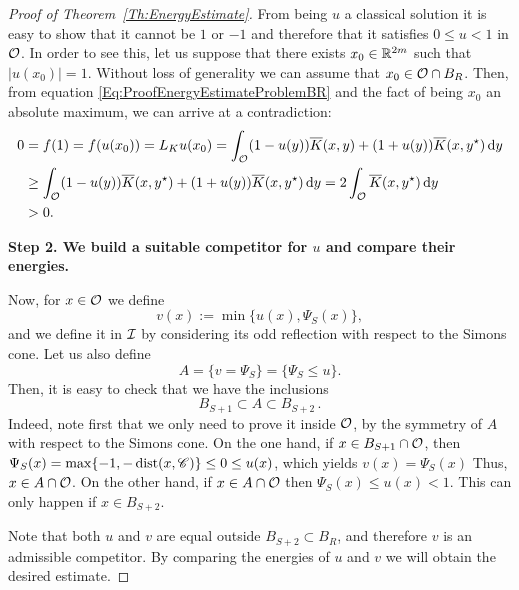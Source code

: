 \begin{proof}[Proof of Theorem~\ref{Th:EnergyEstimate}]
From being $u$ a classical solution it is easy to show that it cannot be $1$ or $-1$ and therefore that it satisfies $0\leq u < 1$ in $\mathcal{O}$. In order to see this, let us suppose that there exists $x_0\in\mathbb{R}^{2m}$ such that $|u(x_0)|=1$. Without loss of generality we can assume that $x_0\in\mathcal{O}\cap B_R$. Then, from equation \eqref{Eq:ProofEnergyEstimateProblemBR} and the fact of being $x_0$ an absolute maximum, we can arrive at a contradiction:
\begin{align*}
0 &= f(1) = f(u(x_0)) = L_K u(x_0) = \int_{\mathcal{O}} (1-u(y)) \overline{K}(x,y) + (1+u(y)) \overline{K}(x,y^\star)  \,\mathrm{d} y \\
&\geq \int_{\mathcal{O}} (1-u(y)) \overline{K}(x,y^\star) + (1+u(y)) \overline{K}(x,y^\star)  \,\mathrm{d} y = 2\int_{\mathcal{O}} \overline{K}(x,y^\star) \,\mathrm{d} y\\
&>0.
\end{align*}

\textbf{Step 2. We build a suitable competitor for $u$ and compare their energies.}

Now, for $x\in \mathcal{O}$ we define
$$ 
v(x) := \min\{u(x),\Psi_S(x)\}, 
$$
and we define it in $\mathcal{I}$ by considering its odd reflection with respect to the Simons cone. Let us also define
$$
A = \{v=\Psi_S\} = \{\Psi_S \leq u\}. 
$$
Then, it is easy to check that we have the inclusions
\begin{equation}
\label{Eq:EnergyEstimateProofInclusionsA}
	B_{S+1} \subset A \subset B_{S+2}\,.
\end{equation}
Indeed, note first that we only need to prove it inside $\mathcal{O}$, by the symmetry of $A$ with respect to the Simons cone. On the one hand, if $ x\in B_{S+1}\cap \mathcal{O}$, then $\Psi_S(x) = \max\{-1,-\operatorname{dist}(x,\mathscr{C})\} \leq 0 \leq u(x)$, which yields $v(x) = \Psi_S(x)$ Thus, $x\in A\cap \mathcal{O}$. On the other hand, if $ x\in A\cap \mathcal{O}$ then $\Psi_S(x) \leq u(x) < 1$. This can only happen if $x\in B_{S+2}$.

Note that both $u$ and $v$ are equal outside $B_{S+2} \subset B_R$, and therefore $v$ is an admissible competitor. By comparing the energies of $u$ and $v$ we will obtain the desired estimate. 


\end{proof}
